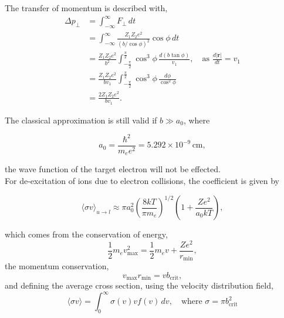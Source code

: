 The transfer of momentum is described with, 
\begin{equation}
  \begin{aligned}
    \Delta p_\perp &= \int_{-\infty}^{\infty} F_\perp\,dt\\
                   &= \int_{-\infty}^{\infty} \frac{Z_1 Z_2 e^2}{(b / \cos\phi)^2}\cos\phi\,dt\\
                   &= \frac{Z_1 Z_2 e^2}{b^2} \int_{-\frac{\pi}{2}}^{\frac{\pi}{2}} \cos^3\phi\,\frac{d(b\tan\phi)}{v_1}, \quad \text{as } \frac{d|\mathbf{r}|}{dt}=v_1\\
                   &= \frac{Z_1 Z_2 e^2}{b v_1} \int_{-\frac{\pi}{2}}^{\frac{\pi}{2}} \cos^3\phi \,\frac{d\phi}{\cos^2\phi}\\
                   &= \frac{2 Z_1 Z_2 e^2}{b v_1}.
  \end{aligned}
\end{equation}

The classical approximation is still valid if $b \gg a_0$, where
\begin{Note}
\begin{equation}
  a_0 = \frac{\hbar^2}{m_e e^2} = 5.292\times10^{-9}\,\text{cm},
\end{equation}
\end{Note}
the wave function of the target electron will not be effected.\\
For de-excitation of ions due to electron collisions, the coefficient is given by
\begin{definition}
\begin{equation}
  \langle\sigma v\rangle_{u\rightarrow l} \approx \pi a_0^2 \left(\frac{8kT}{\pi m_e}\right)^{1/2} \left(1+\frac{Ze^2}{a_0kT}\right),
\end{equation}
\vspace{-5mm}
\end{definition}
which comes from the conservation of energy,
\begin{equation}
  \frac{1}{2}m_e v^2_\text{max} = \frac{1}{2}m_e v + \frac{Ze^2}{r_\text{min}},
\end{equation}
the momentum conservation, 
\begin{equation}
  v_\text{max} r_\text{min} = vb_\text{crit},
\end{equation}
and defining the average cross section, using the velocity distribution field,  
\begin{equation}
  \langle\sigma v\rangle = \int_0^\infty \sigma(v)v f(v)\,dv, \quad \text{where } \sigma = \pi b^2_\text{crit}
\end{equation}

